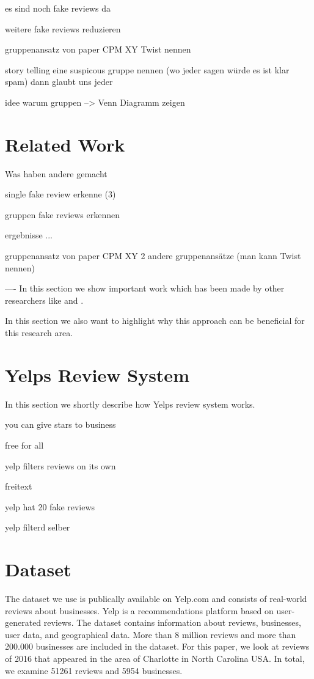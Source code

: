 \documentclass[conference]{IEEEtran}  %
\theoremstyle{plain}
\theoremstyle{definition}
\theoremstyle{remark}
\begin{document}
es sind noch fake reviews da

weitere fake reviews reduzieren

gruppenansatz von paper CPM XY
Twist nennen

story telling eine suspicous gruppe nennen
(wo jeder sagen würde es ist klar spam)
dann glaubt uns jeder

idee warum gruppen --> Venn Diagramm zeigen 

\section{Related Work}
\label{sec:related_work}

Was haben andere gemacht

single fake review erkenne (3)

gruppen fake reviews erkennen

ergebnisse ...

gruppenansatz von paper CPM XY
2 andere gruppenansätze
(man kann Twist nennen)


----
In this section we show important work which has been made by other researchers like 
\cite{mukherjee2013spotting} and \cite{choo2015detecting}.

In this section we also want to highlight why this approach can be beneficial for this research area. 

\section{Yelps Review System}
\label{sec:Yelps review_system}

In this section we shortly describe how Yelps review system works. 

you can give stars to business

free for all

yelp filters reviews on its own

freitext

yelp hat 20 fake reviews

yelp filterd selber


\section{Dataset}
\label{sec:dataset}

The dataset we use is publically available on Yelp.com and consists of real-world reviews about businesses. Yelp is a recommendations platform based on user-generated reviews. The dataset contains information about reviews, businesses, user data, and geographical data. More than 8 million reviews and more than 200.000 businesses are included in the dataset. For this paper, we look at reviews of 2016 that appeared in the area of Charlotte in North Carolina USA. In total, we examine 51261 reviews and 5954 businesses.  
\end{document}
